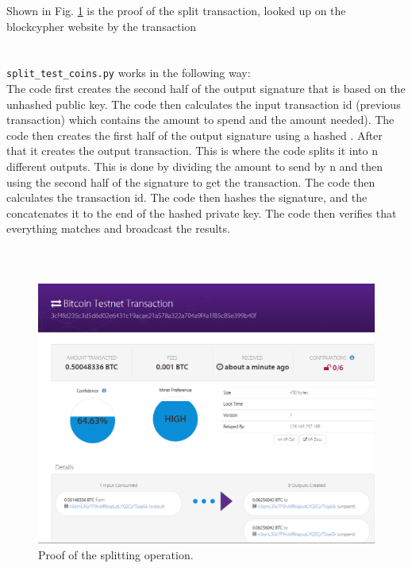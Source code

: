 \documentclass[letterpaper]{article}
\begin{document}
Shown in Fig. \ref{fig:split} is the proof of the split transaction, looked up on the blockcypher website by the transaction


\section{}
\texttt{split\_test\_coins.py} works in the following way:
\\
The code first creates the second half of the output signature that is based on the unhashed public key. The code then calculates the input transaction id (previous transaction) which contains the amount to spend and the amount needed). The code then creates the first half of the output signature using a hashed . After that it creates the output transaction. This is where the code splits it into n different outputs. This is done by dividing the amount to send by n and then using the second half of the signature to get the transaction. The code then calculates the transaction id. The code then hashes the signature, and the concatenates it to the end of the hashed private key. The code then verifies that everything matches and broadcast the results.
\\
\\


\section{}

\section{}


\begin{figure}[h!]
\centering
\includegraphics[width=\textwidth]{splitProof}
\caption{Proof of the splitting operation.}
\label{fig:split}
\end{figure}
\end{document}
